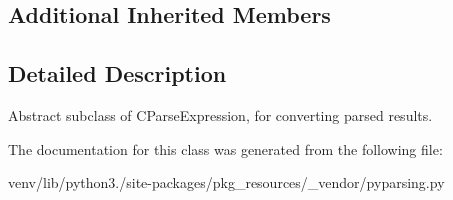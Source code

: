 \subsection*{Additional Inherited Members}


\subsection{Detailed Description}
\begin{DoxyVerb}Abstract subclass of C{ParseExpression}, for converting parsed results.
\end{DoxyVerb}
 

The documentation for this class was generated from the following file\+:\begin{DoxyCompactItemize}
\item 
venv/lib/python3./site-\/packages/pkg\+\_\+resources/\+\_\+vendor/pyparsing.\+py\end{DoxyCompactItemize}
